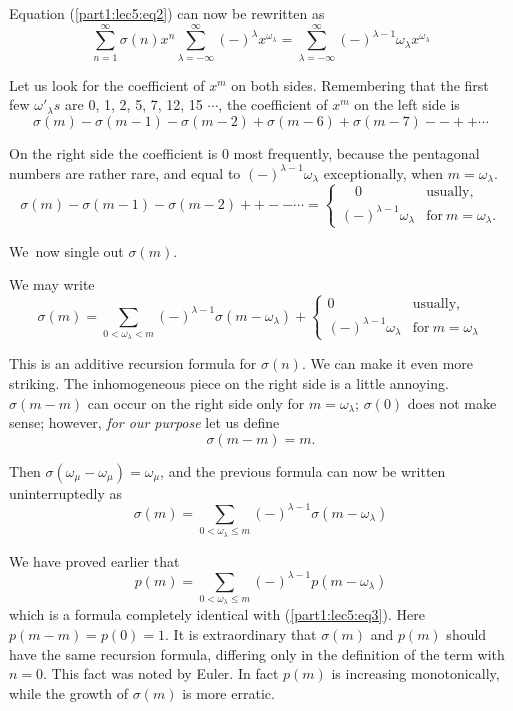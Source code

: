 Equation (\ref{part1:lec5:eq2}) can now be rewritten as 
$$
\sum^\infty_{n=1} \sigma(n) x^n
\sum^\infty_{\lambda=-\infty}(-)^\lambda x^{\omega_\lambda} =
\sum^\infty_{\lambda=-\infty}(-)^{\lambda-1} \omega_\lambda x^{\omega_\lambda}
$$

Let us look for the coefficient of $x^m$ on both sides. Remembering
that the first few $\omega'_\lambda s$ are 0, 1, 2, 5, 7, 12, 15
$\cdots$, the coefficient of $x^m$ on the left side is 
$$
\sigma(m) - \sigma(m-1) - \sigma(m-2) + \sigma(m-6)+ \sigma(m-7) -- ++
    \cdots 
$$ 

On the right side the coefficient is $0$ most frequently, because the
pentagonal numbers are rather rare, and equal to $(-)^{\lambda-1}
\omega_\lambda$ exceptionally, when $m= \omega_\lambda$.
$$
\sigma(m) - \sigma(m-1) - \sigma(m-2) ++ -- \cdots = 
\begin{cases}
  \quad 0 & \text{usually},\\
  (-)^{\lambda-1}\omega_\lambda & \text{for}~ m= \omega_\lambda.
\end{cases}
$$

We\pageoriginale\  now single out $\sigma(m)$.

We may write
$$
\sigma(m) = \sum_{0 < \omega_\lambda < m} (-)^{\lambda-1} \sigma(m-
\omega_\lambda) + 
\begin{cases}
  0 & \text{usually},\\
  (-)^{\lambda-1} \omega_\lambda & \text{for}~ m= \omega_\lambda 
\end{cases}
$$

This is an additive recursion formula for $\sigma(n)$. We can make it
even more striking. The inhomogeneous piece on the right side is a
little annoying. $\sigma(m-m)$ can occur on the right side only for
$m=\omega_\lambda$; $\sigma(0)$ does not make sense; however,
\textit{for our purpose} let us define
$$
\sigma(m-m)=m.
$$

Then $\sigma(\omega_\mu- \omega_\mu)= \omega_\mu$, and the previous
formula can now be written uninterruptedly as 
\begin{equation*}
  \sigma(m) = \sum_{0 < \omega_\lambda \leq m} (-)^{\lambda-1} \sigma
  (m- \omega_\lambda)\tag{3}\label{part1:lec5:eq3}
\end{equation*}

We have proved earlier that
\begin{equation*}
  p(m) = \sum_{0 < \omega_\lambda \leq m} (-)^{\lambda-1} p
  (m- \omega_\lambda)\tag{4}\label{part1:lec5:eq4}
\end{equation*}
which is a formula completely identical with (\ref{part1:lec5:eq3}). Here $p(m-m)=
p(0)=1$. It is extraordinary that $\sigma(m)$ and $p(m)$ should have
the same recursion formula, differing only in the definition of the
term with $n=0$. This fact was noted by Euler. In fact $p(m)$ is
increasing monotonically, while the growth of $\sigma(m)$ is more
erratic. 

